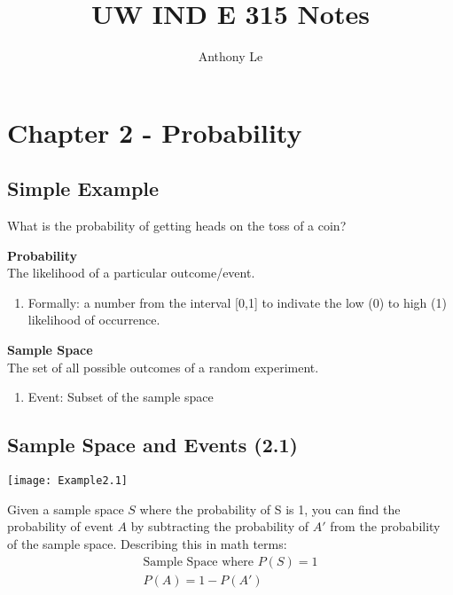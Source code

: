 \documentclass[../INDE315.tex]{subfiles}
\title{UW IND E 315 Notes}
\author{Anthony Le}
\begin{document}
\pagestyle{fancy}
\fancyhead{}


\section*{Chapter 2 - Probability}
\subsection*{Simple Example}
\begin{exmp}
    What is the probability of getting heads on the toss of a coin?
\end{exmp}
\begin{defn}
    \textbf{Probability} \\
    The likelihood of a particular outcome/event.
    \begin{enumerate}
        \item Formally: a number from the interval [0,1] to indivate the low (0) to high (1) likelihood of occurrence.
    \end{enumerate}
\end{defn}

\begin{defn}
    \textbf{Sample Space} \\
    The set of all possible outcomes of a random experiment.
    \begin{enumerate}
        \item Event: Subset of the sample space
    \end{enumerate}
\end{defn}

\subsection*{Sample Space and Events (2.1)}
    \begin{center}
        \texttt{[image: Example2.1]}
    \end{center}
Given a sample space $S$ where the probability of S is 1, you can find the probability of event $A$ by subtracting the probability of $A'$ from the probability of the sample space. Describing this in math terms:
\begin{equation*}
    \begin{aligned}
        \text{Sample Space where } P(S) = 1 \\
        P(A) = 1- P(A')
    \end{aligned}
\end{equation*}
\end{document}
